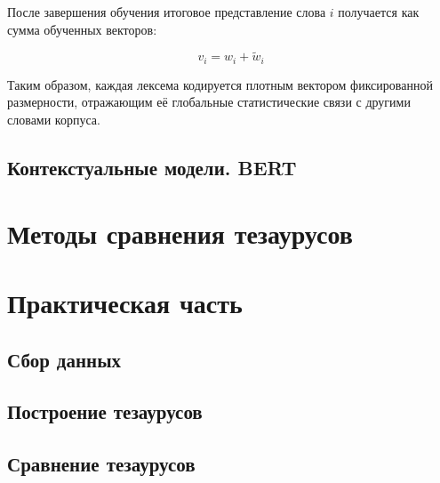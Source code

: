 \documentclass[coursework]{SCWorks}
\begin{document}
После завершения обучения итоговое представление слова $i$ получается как сумма обученных векторов:

\[
v_i = w_i + \tilde{w}_i
\]

Таким образом, каждая лексема кодируется плотным вектором фиксированной размерности, отражающим её глобальные статистические связи с другими словами корпуса.






\subsection{Контекстуальные модели. BERT}
\section{Методы сравнения тезаурусов}

\section{Практическая часть}
\subsection{Сбор данных}
\subsection{Построение тезаурусов}
\subsection{Сравнение тезаурусов}

\conclusion


% 
% 

\appendix
\end{document}
